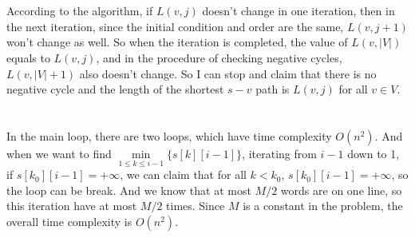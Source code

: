 \documentclass{article}
\begin{document}
\section{}

\begin{multicols}{2}

\end{multicols}

\section{}
According to the algorithm, if $L(v, j)$ doesn't change in one iteration, then in the next iteration, since the initial condition and order are the same, $L(v, j+1)$ won't change as well. So when the iteration is completed, the value of $L(v, |V|)$ equals to $L(v, j)$, and in the procedure of checking negative cycles, $L(v, |V|+1)$ also doesn't change. So I can stop and claim that there is no negative cycle and the length of the shortest $s-v$ path is $L(v, j)$ for all $v \in V $.

\section{}

In the main loop, there are two loops, which have time complexity $O(n^2)$. And when we want to find $\min\limits_{1\leqslant k\leqslant i-1}\{s[k][i-1]\}$, iterating from $i-1$ down to 1, if $s[k_0][i-1]=+\infty$, we can claim that for all $k<k_0$, $s[k_0][i-1]=+\infty$, so the loop can be break. And we know that at most $M/2$ words are on one line, so this iteration have at most $M/2$ times. Since $M$ is a constant in the problem, the overall time complexity is $O(n^2)$.
\end{document}

